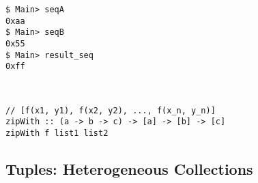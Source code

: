 \begin{lstlisting}[style=zsh]
$ Main> seqA
0xaa
$ Main> seqB
0x55
$ Main> result_seq
0xff
\end{lstlisting}
\begin{note}
\ \begin{lstlisting}[style=haskell]
// [f(x1, y1), f(x2, y2), ..., f(x_n, y_n)]
zipWith :: (a -> b -> c) -> [a] -> [b] -> [c]
zipWith f list1 list2
\end{lstlisting}
\end{note}

\subsection{Tuples: Heterogeneous Collections}
